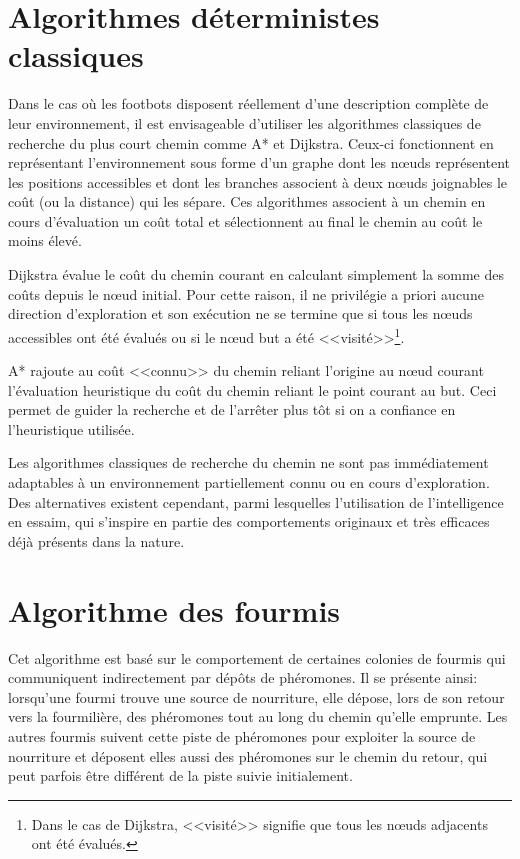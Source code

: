 \section{Algorithmes déterministes classiques}

Dans le cas où les footbots disposent réellement d'une description complète de leur environnement, il est envisageable d'utiliser les algorithmes classiques de recherche du plus court chemin comme A* et Dijkstra. Ceux-ci fonctionnent en représentant l'environnement sous forme d'un graphe dont les n\oe{}uds représentent les positions accessibles et dont les branches associent à deux n\oe{}uds joignables le coût (ou la distance) qui les sépare. Ces algorithmes associent à un chemin en cours d'évaluation un coût total et sélectionnent au final le chemin au coût le moins élevé.

Dijkstra évalue le coût du chemin courant en calculant simplement la somme des coûts depuis le n\oe{}ud initial. Pour cette raison, il ne privilégie a priori aucune direction d'exploration et son exécution ne se termine que si tous les n\oe{}uds accessibles ont été évalués ou si le n\oe{}ud but a été <<visité>>\footnote{Dans le cas de Dijkstra, <<visité>> signifie que tous les n\oe{}uds adjacents ont été évalués.}.

A* rajoute au coût <<connu>> du chemin reliant l'origine au n\oe{}ud courant l'évaluation heuristique du coût du chemin reliant le point courant au but. Ceci permet de guider la recherche et de l'arrêter plus tôt si on a confiance en l'heuristique utilisée.~\cite{mehlhorn_shortest_2008,genetic2007}

Les algorithmes classiques de recherche du chemin ne sont pas immédiatement adaptables à un environnement partiellement connu ou en cours d'exploration. Des alternatives existent cependant, parmi lesquelles l'utilisation de l'intelligence en essaim, qui s'inspire en partie  des comportements originaux et très efficaces déjà présents dans la nature.

\section{Algorithme des fourmis\label{sec:ants}}

Cet algorithme est basé sur le comportement de certaines colonies de fourmis qui communiquent indirectement par dépôts de phéromones. Il se présente ainsi: lorsqu'une fourmi trouve une source de nourriture, elle dépose, lors de son retour vers la fourmilière, des phéromones tout au long du chemin qu'elle emprunte. Les autres fourmis suivent cette piste de phéromones pour exploiter la source de nourriture et déposent elles aussi des phéromones sur le chemin du retour, qui peut parfois être différent de la piste suivie initialement.

